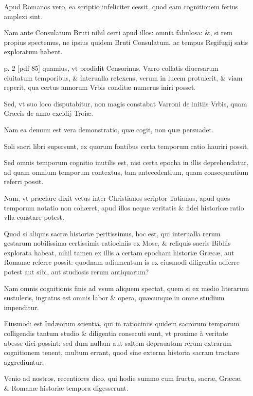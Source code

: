Apud Romanos vero,
ea scriptio infeliciter cessit, quod eam cognitionem ferius amplexi sint.

Nam ante Consulatum Bruti nihil certi apud illos: omnia fabulosa: \&,
si rem propius spectemus, ne ipsius quidem Bruti Consulatum, ac tempus
Regifugij satis exploratum habent.

%

p. 2 [pdf 85]
%
quamius, vt prodidit Censorinus,
Varro collatis diuersarum ciuitatum temporibus, \& interualla retexens,
verum in lucem protulerit, \& viam reperit, qua certus
annorum Vrbis conditæ numerus iniri posset.

Sed, vt suo loco disputabitur,
non magis constabat Varroni de initiis Vrbis, quam Græcis de
anno excidij Troiæ.

Nam ea demum est vera demonstratio, quæ cogit,
non quæ persuadet.

Soli sacri libri supersunt, ex quorum fontibus
certa temporum ratio hauriri possit.

Sed omnis temporum cognitio
inutilis est, nisi certa epocha in illis deprehendatur, ad quam omnium
temporum contextus, tam antecedentium, quam consequentium referri
possit.

Nam, vt præclare dixit vetus inter Christianos scriptor
Tatianus, apud quos temporum notatio non cohæret, apud illos neque
veritatis \& fidei historicæ ratio vlla constare potest.

Quod si aliquis
sacræ historiæ peritissimus, hoc est, qui interualla rerum gestarum
nobilissima certissimis ratiociniis ex Mose, \&
 reliquis sacris Bibliis explorata
habeat, nihil tamen ex illis a certam epocham historiæ Græcæ,
aut Romanæ referre possit: quodnam adiumentum is ex eiusmodi
diligentia adferre potest aut sibi, aut studiosis rerum antiquarum?

Nam omnis cognitionis finis ad vsum aliquem spectat, quem si ex medio
literarum sustuleris, ingratus est omnis labor \& opera, quæcunque
in omne studium impenditur.

Eiusmodi est Iudæorum scientia, qui
in ratiociniis quidem sacrorum temporum colligendis tantum studio
\& diligentia consecuti sunt, vt proxime à veritate abesse dici possint: sed
dum nullam aut saltem deprauatam rerum extrarum cognitionem
tenent, multum errant, quod sine externa historia sacram tractare
aggrediuntur.

Venio ad nostros, recentiores dico, qui hodie summo
cum fructu, sacræ, Græcæ, \& Romanæ historiæ tempora digesserunt.

